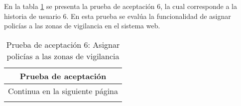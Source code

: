 En la tabla \ref{tab:prueba-6} se presenta la prueba de aceptación 6, la cual corresponde a la historia de usuario 6.
En esta prueba se evalúa la funcionalidad de asignar policías a las zonas de vigilancia en el sistema web.

\begin{longtable}{|p{6.7cm}|p{6.7cm}|}
    \caption{Prueba de aceptación 6: Asignar policías a las zonas de vigilancia} \label{tab:prueba-6}
    \\
    \hline
    \multicolumn{2}{|c|}{\textbf{Prueba de aceptación}}                                                                                                                                                                                                                                                                                                        \\
    \hline

    \endfirsthead

    \hline
    \endhead

    \hline
    \multicolumn{2}{|c|}{{Continua en la siguiente página}}                                                                                                                                                                                                                                                                                                    \\
    \hline
    \endfoot


\end{longtable}

